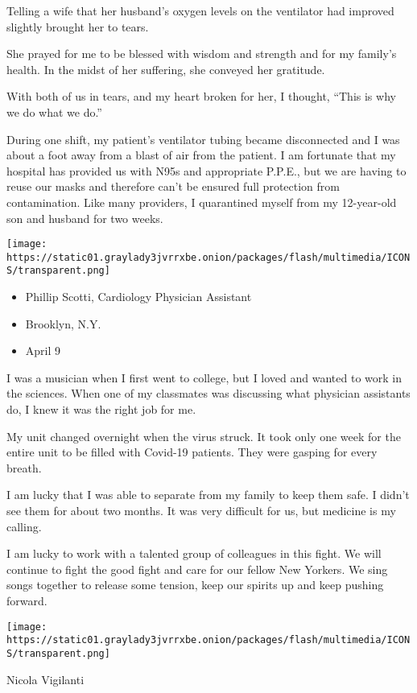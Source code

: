 Telling a wife that her husband's oxygen levels on the ventilator had
improved slightly brought her to tears.

She prayed for me to be blessed with wisdom and strength and for my
family's health. In the midst of her suffering, she conveyed her
gratitude.

With both of us in tears, and my heart broken for her, I thought, ``This
is why we do what we do.''

During one shift, my patient's ventilator tubing became disconnected and
I was about a foot away from a blast of air from the patient. I am
fortunate that my hospital has provided us with N95s and appropriate
P.P.E., but we are having to reuse our masks and therefore can't be
ensured full protection from contamination. Like many providers, I
quarantined myself from my 12-year-old son and husband for two weeks.

\texttt{[image: https://static01.graylady3jvrrxbe.onion/packages/flash/multimedia/ICONS/transparent.png]}

\begin{itemize}
\tightlist
\item
  Phillip Scotti, Cardiology Physician Assistant
\item
  Brooklyn, N.Y.
\item
  April 9
\end{itemize}

I was a musician when I first went to college, but I loved and wanted to
work in the sciences. When one of my classmates was discussing what
physician assistants do, I knew it was the right job for me.

My unit changed overnight when the virus struck. It took only one week
for the entire unit to be filled with Covid-19 patients. They were
gasping for every breath.

I am lucky that I was able to separate from my family to keep them safe.
I didn't see them for about two months. It was very difficult for us,
but medicine is my calling.

I am lucky to work with a talented group of colleagues in this fight. We
will continue to fight the good fight and care for our fellow New
Yorkers. We sing songs together to release some tension, keep our
spirits up and keep pushing forward.

\texttt{[image: https://static01.graylady3jvrrxbe.onion/packages/flash/multimedia/ICONS/transparent.png]}

Nicola Vigilanti

